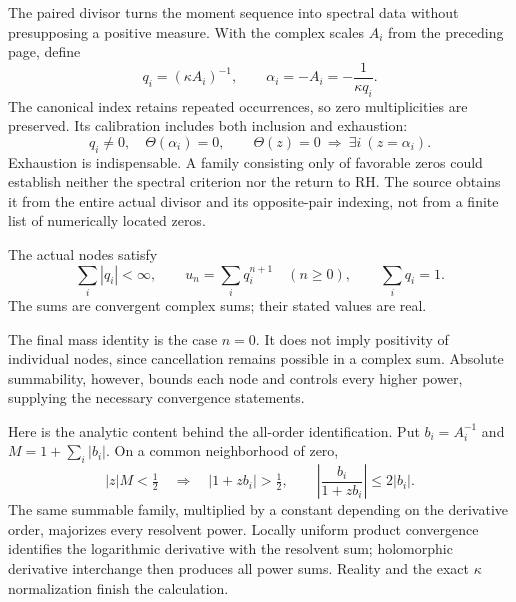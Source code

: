 \label{act:calibration}
The paired divisor turns the moment sequence into spectral data without
presupposing a positive measure. With the complex scales $A_i$ from the
preceding page, define
\begin{equation}\label{act:nodes}
 q_i=(\kappa A_i)^{-1},\qquad
 \alpha_i=-A_i=-\frac1{\kappa q_i}.
\end{equation}
The canonical index retains repeated occurrences, so zero multiplicities
are preserved. Its calibration includes both inclusion and exhaustion:
\begin{equation}\label{act:zero-calibration}
 q_i\ne0,\quad \Theta(\alpha_i)=0,\qquad
 \Theta(z)=0\ \Longrightarrow\ \exists i\ (z=\alpha_i).
\end{equation}
Exhaustion is indispensable. A family consisting only of favorable zeros
could establish neither the spectral criterion nor the return to RH.
The source obtains it from the entire actual divisor and its opposite-pair
indexing, not from a finite list of numerically located zeros.

\begin{theorem}\label{act:power-sums}
The actual nodes satisfy
\begin{equation}\label{act:power-sum-formula}
 \sum_i|q_i|<\infty,\qquad
 u_n=\sum_i q_i^{n+1}\quad(n\ge0),\qquad \sum_iq_i=1.
\end{equation}
The sums are convergent complex sums; their stated values are real.
\end{theorem}
The final mass identity is the case $n=0$. It does not imply positivity
of individual nodes, since cancellation remains possible in a complex
sum. Absolute summability, however, bounds each node and controls every
higher power, supplying the necessary convergence statements.

Here is the analytic content behind the all-order identification. Put
$b_i=A_i^{-1}$ and $M=1+\sum_i|b_i|$. On a common neighborhood of zero,
\begin{equation}
 |z|M<\tfrac12\quad\Longrightarrow\quad
 |1+zb_i|>\tfrac12,\qquad
 \left|\frac{b_i}{1+zb_i}\right|\le2|b_i|.
\end{equation}
The same summable family, multiplied by a constant depending on the
derivative order, majorizes every resolvent power. Locally uniform product
convergence identifies the logarithmic derivative with the resolvent sum;
holomorphic derivative interchange then produces all power sums.
Reality and the exact $\kappa$ normalization finish the calculation.

